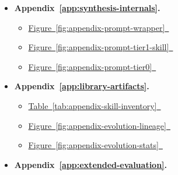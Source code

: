 \begin{center}
\begin{tcolorbox}[
  enhanced,
  colback=HoldFill,
  colframe=HoldInk,
  coltitle=HoldInk,
  colbacktitle=HoldFill,
  titlerule style=HoldInk,
  boxrule=0.75pt,
  arc=2.0pt,
  left=6pt,
  right=6pt,
  top=3pt,
  bottom=3pt,
  toptitle=1.5pt,
  bottomtitle=1.5pt,
  lefttitle=5pt,
  righttitle=5pt,
  titlerule=0.55pt,
  width=0.92\textwidth,
  fonttitle=\sffamily\normalsize\bfseries,
  fontupper=\sffamily\small,
  title={Appendix Figures and Tables}]
\raggedright
\begin{itemize}[leftmargin=1.25em, itemsep=0.14em, parsep=0pt, topsep=0pt]
  \item \textbf{Appendix~\ref*{app:synthesis-internals}.}~
  \begin{itemize}[leftmargin=1.1em, itemsep=0.04em, parsep=0pt, topsep=0.04em]
    \item \hyperref[fig:appendix-prompt-wrapper]{Figure~\ref*{fig:appendix-prompt-wrapper}~}
    \item \hyperref[fig:appendix-prompt-tier1-skill]{Figure~\ref*{fig:appendix-prompt-tier1-skill}~}
    \item \hyperref[fig:appendix-prompt-tier0]{Figure~\ref*{fig:appendix-prompt-tier0}~}
  \end{itemize}
  \item \textbf{Appendix~\ref*{app:library-artifacts}.}~
  \begin{itemize}[leftmargin=1.1em, itemsep=0.04em, parsep=0pt, topsep=0.04em]
    \item \hyperref[tab:appendix-skill-inventory]{Table~\ref*{tab:appendix-skill-inventory}~}
    \item \hyperref[fig:appendix-evolution-lineage]{Figure~\ref*{fig:appendix-evolution-lineage}~}
    \item \hyperref[fig:appendix-evolution-stats]{Figure~\ref*{fig:appendix-evolution-stats}~}
  \end{itemize}
  \item \textbf{Appendix~\ref*{app:extended-evaluation}.}~

\end{itemize}
\end{tcolorbox}
\end{center}
